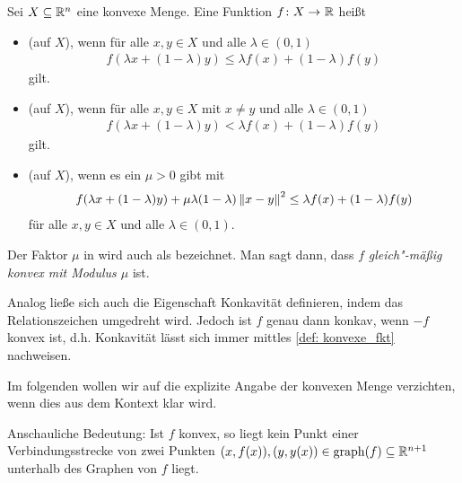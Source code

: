 \documentclass[ %
ngerman, %
a4paper, 
12pt,%
sectionreset, %
chapterstyle=framed, %
sectionstyle=pure, %
titlefont=osfamily %
]{../texmf/tex/latex/mathscriptMathTUD/mathscriptMathTUD}
\begin{document}
\begin{definition} \label{def: konvexe_fkt}
	Sei $X \subseteq \mathbb{R}^n$ eine konvexe Menge. Eine Funktion $\abb{f}{X}{\R}$ heißt
	\begin{itemize}[leftmargin=*]
		\item {} (auf $X$), wenn für alle $x,y \in X$ und alle $\lambda \in (0,1)$ 
		\begin{align} \label{eq: konvexe_fkt}
			f(\lambda x + (1-\lambda)y) \leq \lambda f(x) + (1-\lambda) f(y)
		\end{align}
		gilt.
		\item {} (auf $X$), wenn für alle $x,y \in X$ mit $x \neq y$ und alle $\lambda \in (0,1)$ 
		\begin{align} \label{eq: strikt_konvex}
			f(\lambda x + (1-\lambda)y) < \lambda f(x) + (1-\lambda) f(y)
		\end{align}
		gilt.
		\item {} (auf $X$), wenn es ein $\mu > 0$ gibt mit 
		\begin{align} \label{eq: gleichmaessig_konvex}
			f(\lambda x + (1-\lambda)y) + \mu \lambda (1-\lambda) \left\lVert x-y \right\rVert^2 \leq \lambda f(x) + (1-\lambda) f(y)
		\end{align}
		für alle $x,y \in X$ und alle $\lambda \in (0,1)$.
	\end{itemize}
\end{definition}

\begin{bemerkung}
	Der Faktor $\mu$ in  wird auch als  bezeichnet. Man sagt dann, dass $f$ \textit{gleich"-mäßig konvex mit Modulus $\mu$} ist.
	
	Analog ließe sich auch die Eigenschaft Konkavität definieren, indem das Relationszeichen umgedreht wird. Jedoch ist $f$ genau dann konkav, wenn $-f$ konvex ist, d.h. Konkavität lässt sich immer mittles \cref{def: konvexe_fkt} nachweisen.
	
	Im folgenden wollen wir auf die explizite Angabe der konvexen Menge verzichten, wenn dies aus dem Kontext klar wird.
\end{bemerkung}

Anschauliche Bedeutung:
Ist $f$ konvex, so liegt kein Punkt einer Verbindungsstrecke von zwei Punkten $(x,f(x)) , (y,y(x)) \in \operatorname{graph}(f) \subseteq \mathbb{R}^{n+1}$ unterhalb des Graphen von $f$ liegt.

\end{document}

